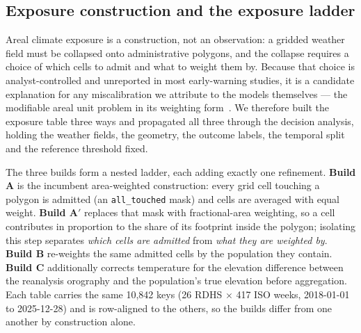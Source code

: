 \providecommand{\REBUILD}{\textsuperscript{\ddag}}


\subsection{Exposure construction and the exposure ladder}
\label{sec:methods-wp5}

Areal climate exposure is a construction, not an observation: a gridded weather field must be collapsed onto administrative polygons, and the collapse requires a choice of which cells to admit and what to weight them by. Because that choice is analyst-controlled and unreported in most early-warning studies, it is a candidate explanation for any miscalibration we attribute to the models themselves --- the modifiable areal unit problem in its weighting form~\cite{Openshaw1984,Fotheringham1991}. We therefore built the exposure table three ways and propagated all three through the decision analysis, holding the weather fields, the geometry, the outcome labels, the temporal split and the reference threshold fixed.

The three builds form a nested ladder, each adding exactly one refinement. \textbf{Build A} is the incumbent area-weighted construction: every grid cell touching a polygon is admitted (an \texttt{all\_touched} mask) and cells are averaged with equal weight. \textbf{Build A$'$} replaces that mask with fractional-area weighting, so a cell contributes in proportion to the share of its footprint inside the polygon; isolating this step separates \emph{which cells are admitted} from \emph{what they are weighted by}. \textbf{Build B} re-weights the same admitted cells by the population they contain. \textbf{Build C} additionally corrects temperature for the elevation difference between the reanalysis orography and the population's true elevation before aggregation. Each table carries the same 10{,}842 keys (26 RDHS $\times$ 417 ISO weeks, 2018-01-01 to 2025-12-28) and is row-aligned to the others, so the builds differ from one another by construction alone.

